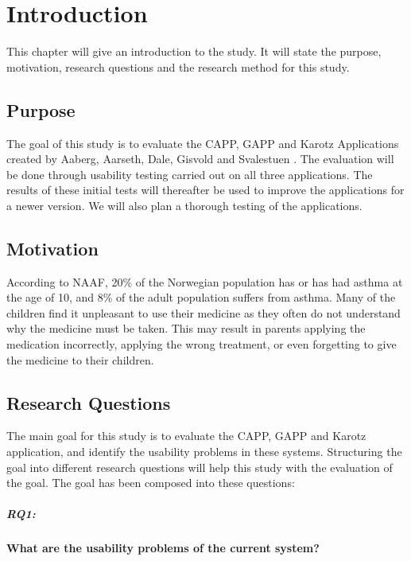 \chapter{Introduction}
\label{chp:introduction}

This chapter will give an introduction to the study. It will state the purpose, motivation, research questions and the research method for this study. 

\section{Purpose}
\label{sec:purpose}
The goal of this study is to evaluate the CAPP, GAPP and Karotz Applications created by Aaberg, Aarseth, Dale, Gisvold and Svalestuen \cite{CustomerDriven}.
The evaluation will be done through usability testing carried out on all three applications. The results of these initial tests will thereafter be used to improve the applications for a newer version. 
We will also plan a thorough testing of the applications.


\section{Motivation}
\label{sec:motivation}
According to NAAF, 20\% \cite{NAAF} of the Norwegian population has or has had asthma at the age of 10, and 8\% of the adult population suffers from asthma. Many of the children find it unpleasant to use their medicine as they often do not understand why the medicine must be taken. This may result in parents applying the medication incorrectly, applying the wrong treatment, or even forgetting to give the medicine to their children. 


\section{Research Questions}
\label{sec:researchquestions}
The main goal for this study is to evaluate the CAPP, GAPP and Karotz application, and identify the usability problems in these systems. Structuring the goal into different research questions will help this study with the evaluation of the goal. The goal has been composed into these questions:

\paragraph{RQ1:}
\textbf{What are the usability problems of the current system?}


